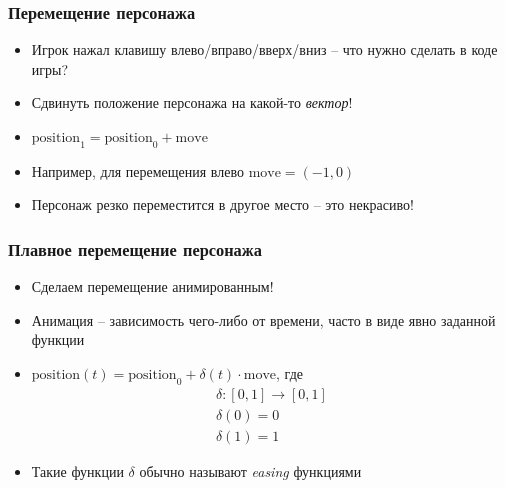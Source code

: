 \documentclass[10pt]{beamer}
\begin{document}
\begin{frame}
\frametitle{Перемещение персонажа}
\begin{itemize}
\item Игрок нажал клавишу влево/вправо/вверх/вниз -- что нужно сделать в коде игры?
\pause
\item Сдвинуть положение персонажа на какой-то \textit{вектор}!
\pause
\item \begin{math}\text{position}_1 = \text{position}_0 + \text{move}\end{math}
\pause
\item Например, для перемещения влево \begin{math}\text{move} = (-1, 0)\end{math}
\pause
\item Персонаж резко переместится в другое место -- это некрасиво!
\end{itemize}
\end{frame}

\begin{frame}
\frametitle{Плавное перемещение персонажа}
\begin{itemize}
\item Сделаем перемещение анимированным!
\pause
\item Анимация -- зависимость чего-либо от времени, часто в виде явно заданной функции
\pause
\item \begin{math}\text{position}(t) = \text{position}_0 + \delta(t) \cdot \text{move}\end{math}, где
\begin{gather*}
\delta : [0, 1] \rightarrow [0, 1] \\
\delta(0) = 0 \\
\delta(1) = 1
\end{gather*}
\pause
\item Такие функции \begin{math}\delta\end{math} обычно называют \textit{easing} функциями
\end{itemize}
\end{frame}
\end{document}

